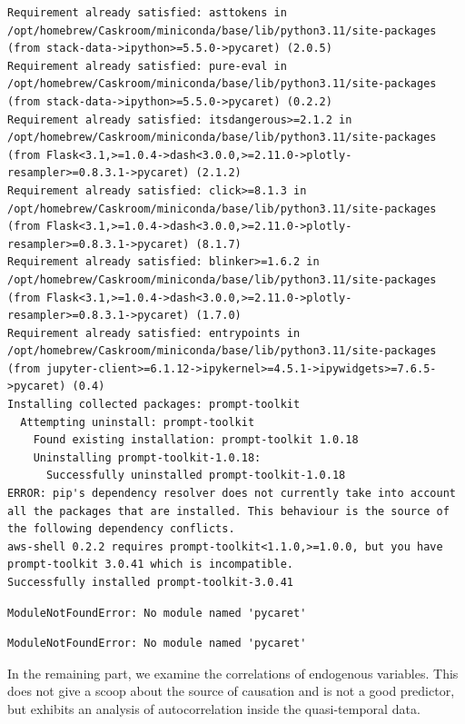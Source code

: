 \documentclass[
  letterpaper,
  DIV=11,
  numbers=noendperiod]{scrartcl}
\begin{document}
\begin{verbatim}
Requirement already satisfied: asttokens in /opt/homebrew/Caskroom/miniconda/base/lib/python3.11/site-packages (from stack-data->ipython>=5.5.0->pycaret) (2.0.5)
Requirement already satisfied: pure-eval in /opt/homebrew/Caskroom/miniconda/base/lib/python3.11/site-packages (from stack-data->ipython>=5.5.0->pycaret) (0.2.2)
Requirement already satisfied: itsdangerous>=2.1.2 in /opt/homebrew/Caskroom/miniconda/base/lib/python3.11/site-packages (from Flask<3.1,>=1.0.4->dash<3.0.0,>=2.11.0->plotly-resampler>=0.8.3.1->pycaret) (2.1.2)
Requirement already satisfied: click>=8.1.3 in /opt/homebrew/Caskroom/miniconda/base/lib/python3.11/site-packages (from Flask<3.1,>=1.0.4->dash<3.0.0,>=2.11.0->plotly-resampler>=0.8.3.1->pycaret) (8.1.7)
Requirement already satisfied: blinker>=1.6.2 in /opt/homebrew/Caskroom/miniconda/base/lib/python3.11/site-packages (from Flask<3.1,>=1.0.4->dash<3.0.0,>=2.11.0->plotly-resampler>=0.8.3.1->pycaret) (1.7.0)
Requirement already satisfied: entrypoints in /opt/homebrew/Caskroom/miniconda/base/lib/python3.11/site-packages (from jupyter-client>=6.1.12->ipykernel>=4.5.1->ipywidgets>=7.6.5->pycaret) (0.4)
Installing collected packages: prompt-toolkit
  Attempting uninstall: prompt-toolkit
    Found existing installation: prompt-toolkit 1.0.18
    Uninstalling prompt-toolkit-1.0.18:
      Successfully uninstalled prompt-toolkit-1.0.18
ERROR: pip's dependency resolver does not currently take into account all the packages that are installed. This behaviour is the source of the following dependency conflicts.
aws-shell 0.2.2 requires prompt-toolkit<1.1.0,>=1.0.0, but you have prompt-toolkit 3.0.41 which is incompatible.
Successfully installed prompt-toolkit-3.0.41
\end{verbatim}

\begin{verbatim}
ModuleNotFoundError: No module named 'pycaret'
\end{verbatim}

\begin{verbatim}
ModuleNotFoundError: No module named 'pycaret'
\end{verbatim}

In the remaining part, we examine the correlations of endogenous
variables. This does not give a scoop about the source of causation and
is not a good predictor, but exhibits an analysis of autocorrelation
inside the quasi-temporal data.
\end{document}
